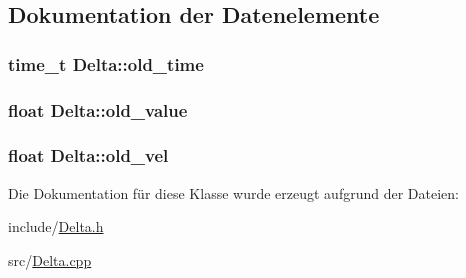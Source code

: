 \subsection{Dokumentation der Datenelemente}
\hypertarget{class_delta_aec1a12c9785ec159f541663926eda55d}{
\subsubsection[{old\_\-time}]{\setlength{\rightskip}{0pt plus 5cm}time\_\-t {\bf Delta::old\_\-time}}}
\label{class_delta_aec1a12c9785ec159f541663926eda55d}
\hypertarget{class_delta_a1724264763801016d7d1c0d5f4817a96}{
\subsubsection[{old\_\-value}]{\setlength{\rightskip}{0pt plus 5cm}float {\bf Delta::old\_\-value}}}
\label{class_delta_a1724264763801016d7d1c0d5f4817a96}
\hypertarget{class_delta_a479029e6db0f2738547961f0d72bec78}{
\subsubsection[{old\_\-vel}]{\setlength{\rightskip}{0pt plus 5cm}float {\bf Delta::old\_\-vel}}}
\label{class_delta_a479029e6db0f2738547961f0d72bec78}


Die Dokumentation für diese Klasse wurde erzeugt aufgrund der Dateien:\begin{DoxyCompactItemize}
\item 
include/\hyperlink{_delta_8h}{Delta.h}\item 
src/\hyperlink{_delta_8cpp}{Delta.cpp}\end{DoxyCompactItemize}
